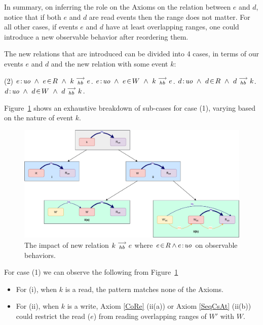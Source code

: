     In summary, on inferring the role on the Axioms on the relation between $e$ and $d$, notice that if both $e$ and $d$ are read events then the range does not matter. 
    For all other cases, if events $e$ and $d$ have at least overlapping ranges, one could introduce a new observable behavior after reordering them.
    
    The new relations that are introduced can be divided into 4 cases, in terms of our events $e$ and $d$ and the new relation with some event $k$:
    \begin{tasks}[style=enumerate](2)
        \task  $\et{e}{uo} \ \wedge \ \event{e}{R} \ \wedge \ \reln{k}{hb}{e}$.
        \task  $e\!:\!\textit{uo} \ \wedge \ e\!\in\!W \ \wedge \ k\stackrel{\longrightarrow}{_{hb}}e$.
        \task  $\et{d}{uo} \ \wedge \ \event{d}{R} \ \wedge \ \reln{d}{hb}{k}$.
        \task  $d\!:\!\textit{uo} \ \wedge \ d\!\in\!W \ \wedge \ d\stackrel{\longrightarrow}{_{hb}}k$.
    \end{tasks}
    
    Figure~\ref{reord:case1} shows an exhaustive breakdown of sub-cases for case (1), varying based
    on the nature of event $k$.
    \begin{figure}[H]
        \centering
        \includegraphics[scale=0.6]{4.InstructionReordering/4.ValidReorderingCandidate/ProofParts/Part4/part4(a).pdf}
        \caption{The impact of new relation $k\stackrel{\longrightarrow}{_{hb}}e$ where $e\!\in\!R \wedge e\!:\!\textit{uo}$ on observable behaviors.}
        \label{reord:case1}
    \end{figure}
    
    For case (1) we can observe the following from Figure~\ref{reord:case1} 
    \begin{itemize}
        \item For (i), when $k$ is a read, the pattern matches none of the Axioms.
        \item For (ii), when $k$ is a write, Axiom \ref{CoRe} (ii(a)) or Axiom \ref{SeqCsAt} (ii(b)) could restrict the read ($e$) from reading overlapping ranges of $W'$ with $W$.
    \end{itemize}

